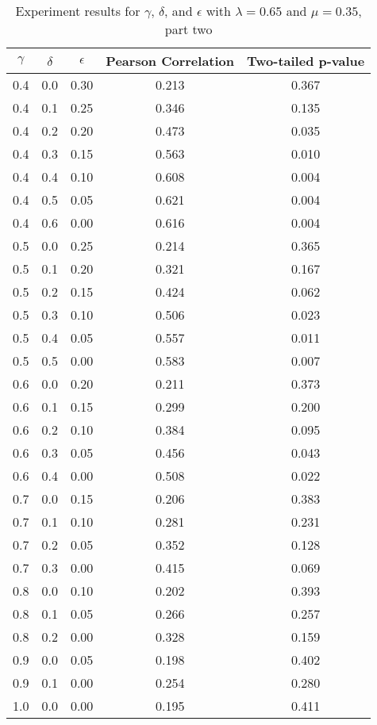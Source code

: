 \documentclass{article}
\begin{document}
\begin{table}[h!]
\caption{Experiment results for $\gamma$, $\delta$, and $\epsilon$ with $\lambda = 0.65$ and $\mu = 0.35$, part two}
\centering
\begin{tabular}{|c|c|c||c|c|}
	\hline
	$\gamma$ & $\delta$ & $\epsilon$ & Pearson Correlation & Two-tailed p-value \\
	\hline
	\hline
	0.4 & 0.0 & 0.30 & 0.213 & 0.367 \\
	0.4 & 0.1 & 0.25 & 0.346 & 0.135 \\
	0.4 & 0.2 & 0.20 & 0.473 & 0.035 \\
	0.4 & 0.3 & 0.15 & 0.563 & 0.010 \\
	0.4 & 0.4 & 0.10 & 0.608 & 0.004 \\
	0.4 & 0.5 & 0.05 & 0.621 & 0.004 \\
	0.4 & 0.6 & 0.00 & 0.616 & 0.004 \\
	\hline
	0.5 & 0.0 & 0.25 & 0.214 & 0.365 \\
	0.5 & 0.1 & 0.20 & 0.321 & 0.167 \\
	0.5 & 0.2 & 0.15 & 0.424 & 0.062 \\
	0.5 & 0.3 & 0.10 & 0.506 & 0.023 \\
	0.5 & 0.4 & 0.05 & 0.557 & 0.011 \\
	0.5 & 0.5 & 0.00 & 0.583 & 0.007 \\
	\hline
	0.6 & 0.0 & 0.20 & 0.211 & 0.373 \\
	0.6 & 0.1 & 0.15 & 0.299 & 0.200 \\
	0.6 & 0.2 & 0.10 & 0.384 & 0.095 \\
	0.6 & 0.3 & 0.05 & 0.456 & 0.043 \\
	0.6 & 0.4 & 0.00 & 0.508 & 0.022 \\
	\hline
	0.7 & 0.0 & 0.15 & 0.206 & 0.383 \\
	0.7 & 0.1 & 0.10 & 0.281 & 0.231 \\
	0.7 & 0.2 & 0.05 & 0.352 & 0.128 \\
	0.7 & 0.3 & 0.00 & 0.415 & 0.069 \\
	\hline
	0.8 & 0.0 & 0.10 & 0.202 & 0.393 \\
	0.8 & 0.1 & 0.05 & 0.266 & 0.257 \\
	0.8 & 0.2 & 0.00 & 0.328 & 0.159 \\
	\hline
	0.9 & 0.0 & 0.05 & 0.198 & 0.402 \\
	0.9 & 0.1 & 0.00 & 0.254 & 0.280 \\
	\hline
	1.0 & 0.0 & 0.00 & 0.195 & 0.411 \\
	\hline
\end{tabular}
\label{table:gammaresults2}
\end{table}
\end{document}

